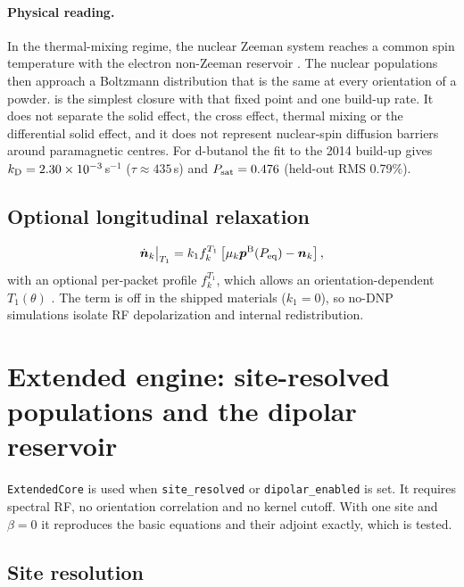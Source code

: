 \documentclass[11pt]{article}
\newcommand{\code}[1]{\texttt{#1}}
\begin{document}
\paragraph{Physical reading.} In the thermal-mixing regime, the nuclear Zeeman system reaches a
common spin temperature with the electron non-Zeeman reservoir
\cite{Borghini1968,AbragamGoldman1978,Wenckebach2016}. The nuclear populations then approach a
Boltzmann distribution that is the same at every orientation of a powder.  is
the simplest closure with that fixed point and one build-up rate. It does not separate the solid
effect, the cross effect, thermal mixing or the differential solid effect, and it does not
represent nuclear-spin diffusion barriers around paramagnetic centres. For d-butanol the fit to
the 2014 build-up gives \(k_{\rm D}=2.30\times10^{-3}\)\,s\(^{-1}\) (\(\tau\approx435\)\,s) and
\(P_{\rm sat}=0.476\) (held-out RMS 0.79\%).

\subsection{Optional longitudinal relaxation}

\begin{equation}
  \dot{\bm n}_k\big|_{T_1}
  =k_1f^{T_1}_k\left[\mu_k\bm p^{\rm B}(P_{\rm eq})-\bm n_k\right],
  \label{eq:T1term}
\end{equation}
with an optional per-packet profile \(f^{T_1}_k\), which allows an orientation-dependent
\(T_1(\theta)\) \cite{Keller2026}. The term is off in the shipped materials (\(k_1=0\)), so
no-DNP simulations isolate RF depolarization and internal redistribution.

\section{Extended engine: site-resolved populations and the dipolar reservoir}
\label{sec:extended}

\code{ExtendedCore} is used when \code{site\_resolved} or \code{dipolar\_enabled} is set. It
requires spectral RF, no orientation correlation and no kernel cutoff. With one site and
\(\beta=0\) it reproduces the basic equations and their adjoint exactly, which is tested.

\subsection{Site resolution}
\end{document}
